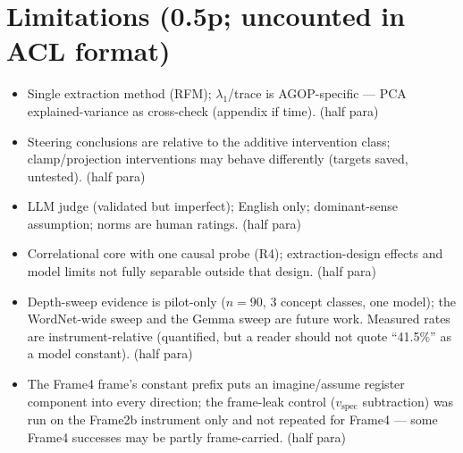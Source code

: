 \documentclass[11pt]{article}
\newenvironment{outline}{\color{gray!70!black}\begin{itemize}[leftmargin=1.2em,itemsep=1pt]}{\end{itemize}\color{black}}
\begin{document}
\section{Limitations (0.5p; uncounted in ACL format)}
\begin{outline}
\item Single extraction method (RFM); $\lambda_1$/trace is AGOP-specific --- PCA explained-variance as cross-check (appendix if time). (half para)
\item Steering conclusions are relative to the additive intervention class; clamp/projection interventions may behave differently (targets saved, untested). (half para)
\item LLM judge (validated but imperfect); English only; dominant-sense assumption; norms are human ratings. (half para)
\item Correlational core with one causal probe (R4); extraction-design effects and model limits not fully separable outside that design. (half para)
\item Depth-sweep evidence is pilot-only ($n{=}90$, 3 concept classes, one model); the WordNet-wide sweep and the Gemma sweep are future work. Measured rates are instrument-relative (quantified, but a reader should not quote ``41.5\%'' as a model constant). (half para)
\item The Frame4 frame's constant prefix puts an imagine/assume register component into every direction; the frame-leak control ($v_{\mathrm{spec}}$ subtraction) was run on the Frame2b instrument only and not repeated for Frame4 --- some Frame4 successes may be partly frame-carried. (half para)
\end{outline}





\end{document}
